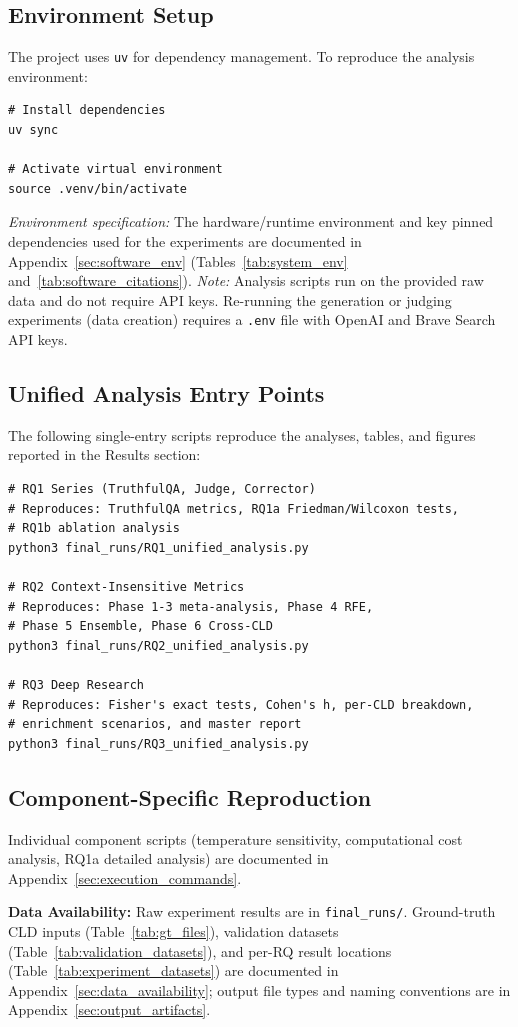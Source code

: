 \subsection{Environment Setup}
The project uses \texttt{uv} for dependency management. To reproduce the analysis environment:
\begin{verbatim}
# Install dependencies
uv sync

# Activate virtual environment
source .venv/bin/activate
\end{verbatim}
\textit{Environment specification:} The hardware/runtime environment and key pinned dependencies used for the experiments are documented in Appendix~\ref{sec:software_env} (Tables~\ref{tab:system_env} and~\ref{tab:software_citations}).
\textit{Note:} Analysis scripts run on the provided raw data and do not require API keys. Re-running the generation or judging experiments (data creation) requires a \texttt{.env} file with OpenAI and Brave Search API keys.

\subsection{Unified Analysis Entry Points}
The following single-entry scripts reproduce the analyses, tables, and figures reported in the Results section:

\begin{verbatim}
# RQ1 Series (TruthfulQA, Judge, Corrector)
# Reproduces: TruthfulQA metrics, RQ1a Friedman/Wilcoxon tests,
# RQ1b ablation analysis
python3 final_runs/RQ1_unified_analysis.py

# RQ2 Context-Insensitive Metrics
# Reproduces: Phase 1-3 meta-analysis, Phase 4 RFE,
# Phase 5 Ensemble, Phase 6 Cross-CLD
python3 final_runs/RQ2_unified_analysis.py

# RQ3 Deep Research
# Reproduces: Fisher's exact tests, Cohen's h, per-CLD breakdown,
# enrichment scenarios, and master report
python3 final_runs/RQ3_unified_analysis.py
\end{verbatim}

\subsection{Component-Specific Reproduction}

Individual component scripts (temperature sensitivity, computational cost analysis, RQ1a detailed analysis) are documented in Appendix~\ref{sec:execution_commands}.

\textbf{Data Availability:} Raw experiment results are in \texttt{final\_runs/}. Ground-truth CLD inputs (Table~\ref{tab:gt_files}), validation datasets (Table~\ref{tab:validation_datasets}), and per-RQ result locations (Table~\ref{tab:experiment_datasets}) are documented in Appendix~\ref{sec:data_availability}; output file types and naming conventions are in Appendix~\ref{sec:output_artifacts}.